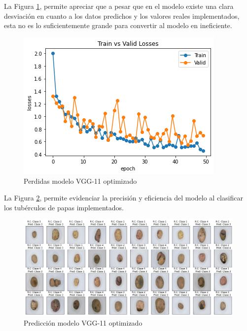 La Figura \ref{fig:perdda_vgg11_opt}, permite apreciar que a pesar que en el modelo existe una clara desviación en cuanto a los datos predichos y los valores reales implementados, esta no es lo suficientemente grande para convertir al modelo en ineficiente.
\begin{figure}[ht]
	\centering
	\includegraphics[scale=0.6]{Figs/509.png}
	\caption{Perdidas modelo VGG-11 optimizado}
	\label{fig:perdda_vgg11_opt}
\end{figure}


La Figura \ref{fig:pre_vgg11_opt}, permite evidenciar la precisión y eficiencia del modelo al clasificar los tubérculos de papas implementados. 	
\begin{figure}[ht]
	\centering
	\includegraphics[scale=0.4]{Figs/510.png}
	\caption{Predicción modelo VGG-11 optimizado}
	\label{fig:pre_vgg11_opt}
\end{figure}


